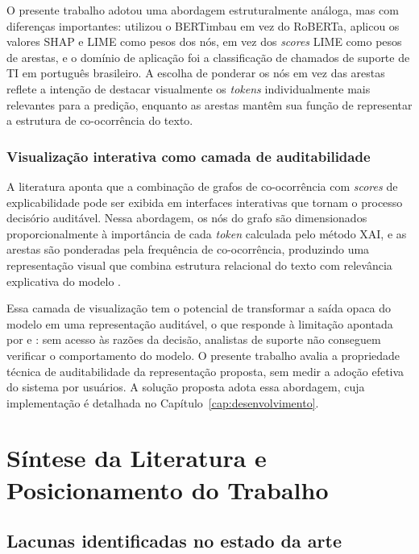 \documentclass[
    12pt,                %
    openright,           %
    oneside,             %
    a4paper,             %
    english,             %
    brazil               %
]{abntex2}
\begin{document}
O presente trabalho adotou uma abordagem estruturalmente análoga, mas com diferenças importantes: utilizou o BERTimbau em vez do RoBERTa, aplicou os valores SHAP e LIME como pesos dos nós, em vez dos \textit{scores} LIME como pesos de arestas, e o domínio de aplicação foi a classificação de chamados de suporte de TI em português brasileiro. A escolha de ponderar os nós em vez das arestas reflete a intenção de destacar visualmente os \textit{tokens} individualmente mais relevantes para a predição, enquanto as arestas mantêm sua função de representar a estrutura de co-ocorrência do texto.

\subsubsection{Visualização interativa como camada de auditabilidade}
\label{subsubsec:grafo_xai_visualizacao}

A literatura aponta que a combinação de grafos de co-ocorrência com \textit{scores} de explicabilidade pode ser exibida em interfaces interativas 
que tornam o processo decisório auditável. Nessa abordagem, os nós 
do grafo são dimensionados proporcionalmente à importância de cada 
\textit{token} calculada pelo método XAI, e as arestas são ponderadas 
pela frequência de co-ocorrência, produzindo uma representação visual 
que combina estrutura relacional do texto com relevância explicativa 
do modelo \cite{talebi2025}.

Essa camada de visualização tem o potencial de transformar a saída 
opaca do modelo em uma representação auditável, o que responde à 
limitação apontada por  e : 
sem acesso às razões da decisão, analistas de suporte não conseguem 
verificar o comportamento do modelo. O presente trabalho avalia a 
propriedade técnica de auditabilidade da representação proposta, sem 
medir a adoção efetiva do sistema por usuários. A solução proposta 
adota essa abordagem, cuja implementação é detalhada no 
Capítulo~\ref{cap:desenvolvimento}.
\section{Síntese da Literatura e Posicionamento do Trabalho}
\label{sec:sintese}

\subsection{Lacunas identificadas no estado da arte}
\label{subsec:sintese_lacunas}
\end{document}
